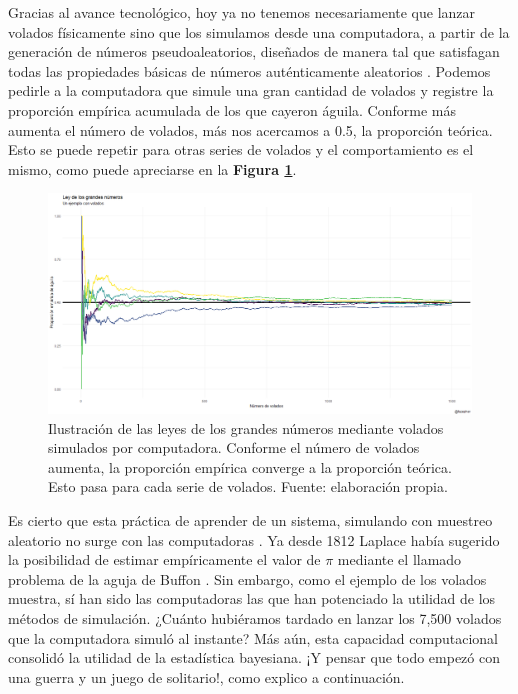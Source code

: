 Gracias al avance tecnológico, hoy ya no tenemos necesariamente que lanzar volados físicamente sino que los simulamos desde una computadora, a partir de la generación de números pseudoaleatorios, diseñados de manera tal que satisfagan todas las propiedades básicas de números auténticamente aleatorios \parencite{Ross13}. Podemos pedirle a la computadora que simule una gran cantidad de volados y registre la proporción empírica acumulada de los que cayeron águila. Conforme más aumenta el número de volados, más nos acercamos a 0.5, la proporción teórica. Esto se puede repetir para otras series de volados y el comportamiento es el mismo, como puede apreciarse en la \textbf{Figura \ref{fig:LGN}}. \\

\begin{figure}[h]
	\centering
	\includegraphics[scale=0.25]{Figs/LGN}
	\caption{Ilustración de las leyes de los grandes números mediante volados simulados por computadora. Conforme el número de volados aumenta, la proporción empírica converge a la proporción teórica. Esto pasa para cada serie de volados. Fuente: elaboración propia.}
	\label{fig:LGN}	
\end{figure}

Es cierto que esta práctica de aprender de un sistema, simulando con muestreo aleatorio no surge con las computadoras \parencite{Owen13}. Ya desde 1812 Laplace había sugerido la posibilidad de estimar empíricamente el valor de $\pi$ mediante el llamado problema de la aguja de Buffon \parencite{Ragheb13}. Sin embargo, como el ejemplo de los volados muestra, sí han sido las computadoras las que han potenciado la utilidad de los métodos de simulación. ¿Cuánto hubiéramos tardado en lanzar los 7,500 volados que la computadora simuló al instante? Más aún, esta capacidad computacional consolidó la utilidad de la estadística bayesiana. ¡Y pensar que todo empezó con una guerra y un juego de solitario!, como explico a continuación.

